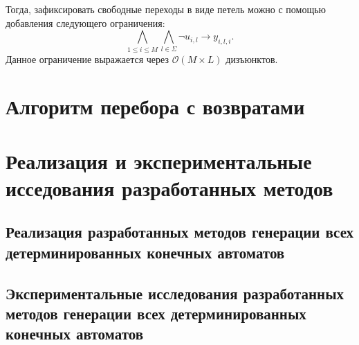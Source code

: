 Тогда, зафиксировать свободные переходы в виде петель можно с помощью добавления следующего ограничения: $$\bigwedge_{1 \leq i \leq M} \bigwedge_{l \in \Sigma} \neg u_{i,l} \rightarrow y_{i,l,i}.$$
Данное ограничение выражается через $\mathcal{O}\left(M\times L\right)$ дизъюнктов.

\section{Алгоритм перебора с возвратами}
\label{sec:findall:backtracking}



\section{Реализация и экспериментальные исседования разработанных методов}
\label{sec:findall:results}


\subsection{Реализация разработанных методов генерации всех детерминированных конечных автоматов}
\label{sec:findall:results:impl}


\subsection{Экспериментальные исследования разработанных методов генерации всех детерминированных конечных автоматов}
\label{sec:findall:results:dfs}


\chresults{\ref{sec:findall}}
